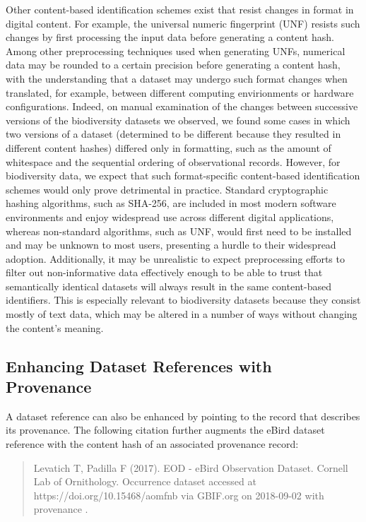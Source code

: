 Other content-based identification schemes exist that resist changes in format in digital content. For example, the universal numeric fingerprint (UNF) \citep{Altman_2007} resists such changes by first processing the input data before generating a content hash. Among other preprocessing techniques used when generating UNFs, numerical data may be rounded to a certain precision before generating a content hash, with the understanding that a dataset may undergo such format changes when translated, for example, between different computing envirionments or hardware configurations. Indeed, on manual examination of the changes between successive versions of the biodiversity datasets we observed, we found some cases in which two versions of a dataset (determined to be different because they resulted in different content hashes) differed only in formatting, such as the amount of whitespace and the sequential ordering of observational records. However, for biodiversity data, we expect that such format-specific content-based identification schemes would only prove detrimental in practice. Standard cryptographic hashing algorithms, such as SHA-256, are included in most modern software environments and enjoy widespread use across different digital applications, whereas non-standard algorithms, such as UNF, would first need to be installed and may be unknown to most users, presenting a hurdle to their widespread adoption. Additionally, it may be unrealistic to expect preprocessing efforts to filter out non-informative data effectively enough to be able to trust that semantically identical datasets will always result in the same content-based identifiers. This is especially relevant to biodiversity datasets because they consist mostly of text data, which may be altered in a number of ways without changing the content’s meaning.

\subsection*{Enhancing Dataset References with Provenance}
A dataset reference can also be enhanced by pointing to the record that describes its provenance. The following citation further augments the eBird dataset reference with the content hash of an associated provenance record:

\begin{quote}
Levatich T, Padilla F (2017). EOD - eBird Observation Dataset. Cornell Lab of Ornithology. Occurrence dataset  accessed at https://doi.org/10.15468/aomfnb via GBIF.org on 2018-09-02 with provenance .
\end{quote}

